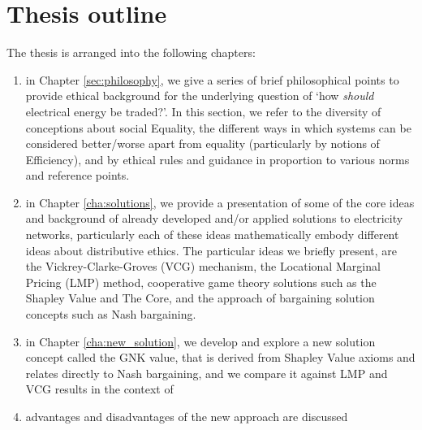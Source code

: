 \section{Thesis outline}
The thesis is arranged into the following chapters:
\begin{enumerate}
\item in Chapter \ref{sec:philosophy}, we give a series of brief philosophical points to provide ethical background for the underlying question of `how \textit{should} electrical energy be traded?'. In this section, we refer to the diversity of conceptions about social Equality, the different ways in which systems can be considered better/worse apart from equality (particularly by notions of Efficiency), and by ethical rules and guidance in proportion to various norms and reference points\DIFaddbegin {}\DIFaddend . 
\item in Chapter \ref{cha:solutions}, we provide a presentation of some of the core ideas and background of already developed and/or applied solutions to electricity networks, particularly each of these ideas mathematically embody different ideas about distributive ethics. The particular ideas we briefly present, are the Vickrey-Clarke-Groves (VCG) mechanism, the Locational Marginal Pricing (LMP) method, cooperative game theory solutions such as the Shapley Value and The Core, and the approach of bargaining solution concepts such as Nash bargaining. 
\item in Chapter \ref{cha:new_solution}, we develop and explore a new solution concept called the GNK value, that is derived from Shapley Value axioms and relates directly to Nash bargaining, and we compare it against LMP and VCG results in the context of \DIFdelbegin {}\DIFdelend \DIFaddbegin {}\item {}\DIFaddend advantages and disadvantages of the new approach are discussed \DIFdelbegin {}\DIFdelend \DIFaddbegin {}
\end{enumerate}
